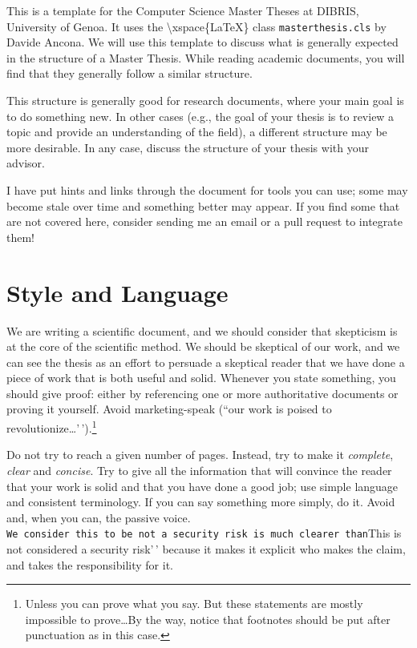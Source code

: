 This is a template for the Computer Science Master Theses at
\ac{DIBRIS}, University of Genoa. It uses the
\textbackslash xspace\{\LaTeX\} class \texttt{masterthesis.cls} by
Davide Ancona. We will use this template to discuss what is generally
expected in the structure of a Master Thesis. While reading academic
documents, you will find that they generally follow a similar structure.

This structure is generally good for research documents, where your main
goal is to do something new. In other cases (e.g., the goal of your
thesis is to review a topic and provide an understanding of the field),
a different structure may be more desirable. In any case, discuss the
structure of your thesis with your advisor.

I have put hints and links through the document for tools you can use;
some may become stale over time and something better may appear. If you
find some that are not covered here, consider sending me an email or a
pull request to integrate them!

\section{Style and Language}

We are writing a scientific document, and we should consider that
skepticism is at the core of the scientific method. We should be
skeptical of our work, and we can see the thesis as an effort to
persuade a skeptical reader that we have done a piece of work that is
both useful and solid. Whenever you state something, you should give
proof: either by referencing one or more authoritative documents or
proving it yourself. Avoid marketing-speak (``our work is poised to
revolutionize\ldots'\,').\footnote{Unless you can
prove what you say. But these statements are mostly impossible to prove\ldots By the
way, notice that footnotes should be put after punctuation as in this case.}

Do not try to reach a given number of pages. Instead, try to make it
\emph{complete}, \emph{clear} and \emph{concise}. Try to give all the
information that will convince the reader that your work is solid and
that you have done a good job; use simple language and consistent
terminology. If you can say something more simply, do it. Avoid
 and,
when you can, the passive voice.
\texttt{We\ consider\ this\ to\ be\ not\ a\ security\ risk\textquotesingle{}\textquotesingle{}\ is\ much\ clearer\ than}This
is not considered a security risk'\,' because it makes it explicit who
makes the claim, and takes the responsibility for it.

